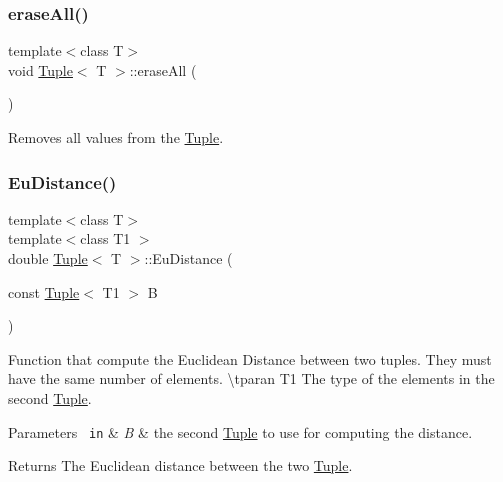 \mbox{\label{class_tuple_ae36c533bd6e97ac45a2ed69a0c4760e4}} 
\subsubsection{\texorpdfstring{eraseAll()}{eraseAll()}}
{\footnotesize\ttfamily template$<$class T$>$ \\
void \mbox{\hyperlink{class_tuple}{Tuple}}$<$ T $>$\+::erase\+All (\begin{DoxyParamCaption}{ }\end{DoxyParamCaption})\hspace{0.3cm}{\ttfamily [inline]}}



Removes all values from the {\ttfamily \mbox{\hyperlink{class_tuple}{Tuple}}}. 

\mbox{\label{class_tuple_a973d6cae203bca0c1ce0d0b65279e433}} 
\subsubsection{\texorpdfstring{EuDistance()}{EuDistance()}}
{\footnotesize\ttfamily template$<$class T$>$ \\
template$<$class T1 $>$ \\
double \mbox{\hyperlink{class_tuple}{Tuple}}$<$ T $>$\+::Eu\+Distance (\begin{DoxyParamCaption}\item[{const \mbox{\hyperlink{class_tuple}{Tuple}}$<$ T1 $>$}]{B }\end{DoxyParamCaption})\hspace{0.3cm}{\ttfamily [inline]}}



Function that compute the Euclidean Distance between two tuples. They must have the same number of elements. \textbackslash{}tparan T1 The type of the elements in the second \mbox{\hyperlink{class_tuple}{Tuple}}. 


\begin{DoxyParams}[1]{Parameters}
\mbox{\texttt{ in}}  & {\em B} & the second \mbox{\hyperlink{class_tuple}{Tuple}} to use for computing the distance. \\
\hline
\end{DoxyParams}
\begin{DoxyReturn}{Returns}
The Euclidean distance between the two \mbox{\hyperlink{class_tuple}{Tuple}}. 
\end{DoxyReturn}
\mbox{\label{class_tuple_aab743167e9fd750f71add11b1aa48f6b}} 
